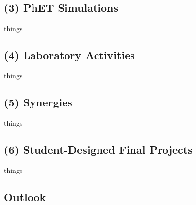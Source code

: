 \documentclass[../../../main.tex]{subfiles}
\begin{document}
\subsection{(3) PhET Simulations}
things
\subsection{(4) Laboratory Activities}
things
\subsection{(5) Synergies}
things
\subsection{(6) Student-Designed Final Projects}
things
\subsection{Outlook}
\end{document}
